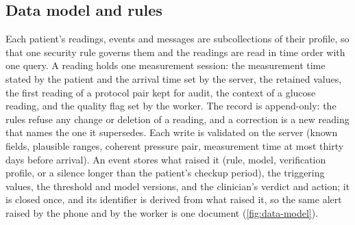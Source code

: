 \documentclass[11pt,a4paper,oneside]{report}
\begin{document}
\subsection{Data model and rules}\label{sec:record-schema}\label{sec:rules}

Each patient's readings, events and messages are subcollections of their profile, so that one security rule governs them and the readings are read in time order with one query. A reading holds one measurement session: the measurement time stated by the patient and the arrival time set by the server, the retained values, the first reading of a protocol pair kept for audit, the context of a glucose reading, and the quality flag set by the worker. The record is append-only: the rules refuse any change or deletion of a reading, and a correction is a new reading that names the one it supersedes. Each write is validated on the server (known fields, plausible ranges, coherent pressure pair, measurement time at most thirty days before arrival). An event stores what raised it (rule, model, verification profile, or a silence longer than the patient's checkup period), the triggering values, the threshold and model versions, and the clinician's verdict and action; it is closed once, and its identifier is derived from what raised it, so the same alert raised by the phone and by the worker is one document (\cref{fig:data-model}).
\end{document}
